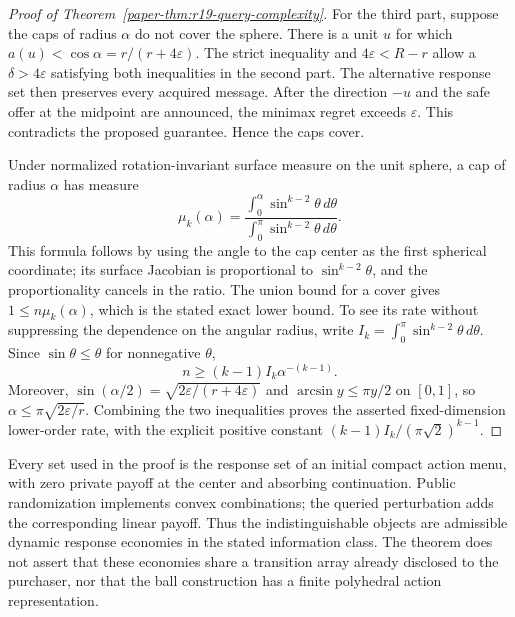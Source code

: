 \begin{proof}[Proof of Theorem~\ref{paper-thm:r19-query-complexity}]
For the third part, suppose the caps of radius $\alpha$ do not cover the sphere. There is a unit $u$ for which $a(u)<\cos\alpha=r/(r+4\varepsilon)$. The strict inequality and $4\varepsilon<R-r$ allow a $\delta>4\varepsilon$ satisfying both inequalities in the second part. The alternative response set then preserves every acquired message. After the direction $-u$ and the safe offer at the midpoint are announced, the minimax regret exceeds $\varepsilon$. This contradicts the proposed guarantee. Hence the caps cover.

Under normalized rotation-invariant surface measure on the unit sphere, a cap of radius $\alpha$ has measure
\[
 \mu_k(\alpha)=\frac{\int_0^\alpha\sin^{k-2}\theta\,d\theta}
 {\int_0^\pi\sin^{k-2}\theta\,d\theta}.
\]
This formula follows by using the angle to the cap center as the first spherical coordinate; its surface Jacobian is proportional to $\sin^{k-2}\theta$, and the proportionality cancels in the ratio. The union bound for a cover gives $1\leq n\mu_k(\alpha)$, which is the stated exact lower bound. To see its rate without suppressing the dependence on the angular radius, write $I_k=\int_0^\pi\sin^{k-2}\theta\,d\theta$. Since $\sin\theta\leq\theta$ for nonnegative $\theta$,
\[
 n\geq(k-1)I_k\alpha^{-(k-1)}.
\]
Moreover, $\sin(\alpha/2)=\sqrt{2\varepsilon/(r+4\varepsilon)}$ and $\arcsin y\leq\pi y/2$ on $[0,1]$, so $\alpha\leq\pi\sqrt{2\varepsilon/r}$. Combining the two inequalities proves the asserted fixed-dimension lower-order rate, with the explicit positive constant $(k-1)I_k/(\pi\sqrt2)^{k-1}$.
\end{proof}

Every set used in the proof is the response set of an initial compact action menu, with zero private payoff at the center and absorbing continuation. Public randomization implements convex combinations; the queried perturbation adds the corresponding linear payoff. Thus the indistinguishable objects are admissible dynamic response economies in the stated information class. The theorem does not assert that these economies share a transition array already disclosed to the purchaser, nor that the ball construction has a finite polyhedral action representation.
